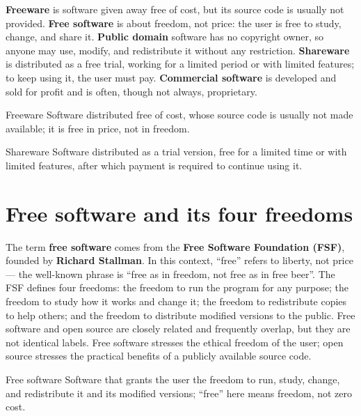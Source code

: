 \textbf{Freeware} is software given away free of cost, but its source code is
usually not provided. \textbf{Free software} is about freedom, not price: the
user is free to study, change, and share it. \textbf{Public domain} software
has no copyright owner, so anyone may use, modify, and redistribute it without
any restriction. \textbf{Shareware} is distributed as a free trial, working
for a limited period or with limited features; to keep using it, the user must
pay. \textbf{Commercial software} is developed and sold for profit and is
often, though not always, proprietary.

\begin{definitionbox}{Freeware}
Software distributed free of cost, whose source code is usually not made
available; it is free in price, not in freedom.
\end{definitionbox}

\begin{definitionbox}{Shareware}
Software distributed as a trial version, free for a limited time or with
limited features, after which payment is required to continue using it.
\end{definitionbox}

\section{Free software and its four freedoms}
The term \textbf{free software} comes from the \textbf{Free Software
Foundation (FSF)}, founded by \textbf{Richard Stallman}. In this context,
``free'' refers to liberty, not price --- the well-known phrase is ``free as in
freedom, not free as in free beer''. The FSF defines four freedoms: the freedom
to run the program for any purpose; the freedom to study how it works and
change it; the freedom to redistribute copies to help others; and the freedom
to distribute modified versions to the public. Free software and open source
are closely related and frequently overlap, but they are not identical labels.
Free software stresses the ethical freedom of the user; open source stresses
the practical benefits of a publicly available source code.

\begin{definitionbox}{Free software}
Software that grants the user the freedom to run, study, change, and
redistribute it and its modified versions; ``free'' here means freedom, not
zero cost.
\end{definitionbox}

